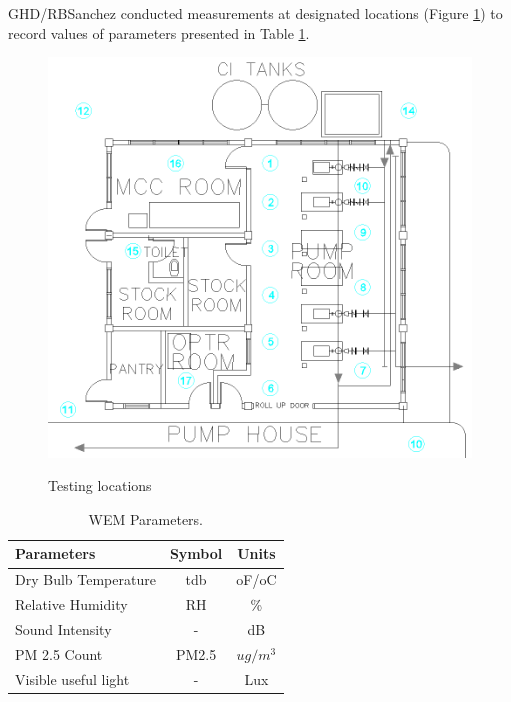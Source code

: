 GHD/RBSanchez conducted measurements at designated locations (Figure \ref{fig_ch02_wem01}) to record values of parameters presented in Table \ref{ch02_tbl_wemparameter}.

\begin{figure}[!htb]
	\includegraphics[width = \textwidth]{figures/fig_ch02_wem01} \\
	\caption{Testing locations}
	\label{fig_ch02_wem01} 
\end{figure}

\begin{table}[h]
	\caption{WEM Parameters.}
	\label{ch02_tbl_wemparameter}
	{\footnotesize
		\begin{tabular}{l|l|l}
			\hline
			Parameters & \multicolumn{1}{c|}{Symbol} & \multicolumn{1}{c}{Units} \\ 
			\hline
			Dry Bulb Temperature & \multicolumn{1}{c|}{tdb} & \multicolumn{1}{c}{oF/oC} \\ 
			Relative Humidity & \multicolumn{1}{c|}{RH} & \multicolumn{1}{c}{\%} \\ 
			Sound Intensity & \multicolumn{1}{c|}{-} & \multicolumn{1}{c}{dB} \\ 
			PM 2.5 Count & \multicolumn{1}{c|}{PM2.5} & \multicolumn{1}{c}{$ug/m^3$} \\ 
			Visible useful light & \multicolumn{1}{c|}{-} & \multicolumn{1}{c}{Lux} \\ 
			\hline
		\end{tabular}	
	}
\end{table}


